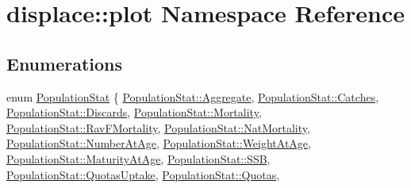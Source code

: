 \hypertarget{namespacedisplace_1_1plot}{}\section{displace\+::plot Namespace Reference}
\label{namespacedisplace_1_1plot}
\subsection*{Enumerations}
\begin{DoxyCompactItemize}
\item 
enum \mbox{\hyperlink{namespacedisplace_1_1plot_a523612c6239ff69acc3e5b7c5b40b618}{Population\+Stat}} \{ \newline
\mbox{\hyperlink{namespacedisplace_1_1plot_a523612c6239ff69acc3e5b7c5b40b618a2ee34178bb8415b7d7234cd27b83aed6}{Population\+Stat\+::\+Aggregate}}, 
\mbox{\hyperlink{namespacedisplace_1_1plot_a523612c6239ff69acc3e5b7c5b40b618a418abe9ece9901c03fab5a37b46a3aaf}{Population\+Stat\+::\+Catches}}, 
\mbox{\hyperlink{namespacedisplace_1_1plot_a523612c6239ff69acc3e5b7c5b40b618a20562ab5758702a830f971d25cba0389}{Population\+Stat\+::\+Discards}}, 
\mbox{\hyperlink{namespacedisplace_1_1plot_a523612c6239ff69acc3e5b7c5b40b618aa2c2bd985ce4138291bc656b03108c24}{Population\+Stat\+::\+Mortality}}, 
\newline
\mbox{\hyperlink{namespacedisplace_1_1plot_a523612c6239ff69acc3e5b7c5b40b618aecb4cfa26e113ef1a6a0eb616f0aa969}{Population\+Stat\+::\+Rav\+F\+Mortality}}, 
\mbox{\hyperlink{namespacedisplace_1_1plot_a523612c6239ff69acc3e5b7c5b40b618a8599a9f8a96c32ffba1e72a69b834eb0}{Population\+Stat\+::\+Nat\+Mortality}}, 
\mbox{\hyperlink{namespacedisplace_1_1plot_a523612c6239ff69acc3e5b7c5b40b618a818600352606592c8c6b71f3116020cf}{Population\+Stat\+::\+Number\+At\+Age}}, 
\mbox{\hyperlink{namespacedisplace_1_1plot_a523612c6239ff69acc3e5b7c5b40b618a290d98f845b46c7b92244507b3d72f5d}{Population\+Stat\+::\+Weight\+At\+Age}}, 
\newline
\mbox{\hyperlink{namespacedisplace_1_1plot_a523612c6239ff69acc3e5b7c5b40b618a3865492eb6623c5eb567905624cabc0a}{Population\+Stat\+::\+Maturity\+At\+Age}}, 
\mbox{\hyperlink{namespacedisplace_1_1plot_a523612c6239ff69acc3e5b7c5b40b618ae7b26d653c8b64a48bef062ac0b67374}{Population\+Stat\+::\+S\+SB}}, 
\mbox{\hyperlink{namespacedisplace_1_1plot_a523612c6239ff69acc3e5b7c5b40b618a07001a8acdacaf52580cd39f23ebf398}{Population\+Stat\+::\+Quotas\+Uptake}}, 
\mbox{\hyperlink{namespacedisplace_1_1plot_a523612c6239ff69acc3e5b7c5b40b618afb0d8a1c841cd92afd4cb16ddedaeed5}{Population\+Stat\+::\+Quotas}}, 

\end{DoxyCompactItemize}
